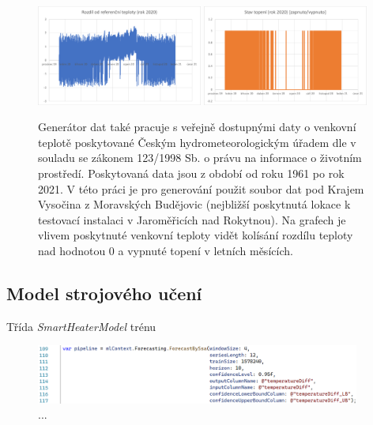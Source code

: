 \pagebreak

\begin{figure}[hbt]
\centering
\includegraphics[width=0.485\textwidth]{obrazky-figures/mlgen_3.png}
\includegraphics[width=0.485\textwidth]{obrazky-figures/mlgen_4.png}
\caption{Generátor dat také pracuje s veřejně dostupnými daty o venkovní teplotě  poskytované Českým hydrometeorologickým úřadem dle \cite{ml-chmu-data} v souladu se zákonem 123/1998 Sb. o právu na informace o životním prostředí. Poskytovaná data jsou z období od roku 1961 po rok 2021. V této práci je pro generování použit soubor dat pod Krajem Vysočina z Moravských Budějovic (nejbližší poskytnutá lokace k testovací instalaci v Jaroměřicích nad Rokytnou). Na grafech je vlivem poskytnuté venkovní teploty vidět kolísání rozdílu teploty nad hodnotou 0 a vypnuté topení v letních měsících.}
\end{figure}


\subsection{Model strojového učení}
Třída {\it SmartHeaterModel} trénu

\begin{figure}[hbt]
\includegraphics[width=0.95\textwidth]{obrazky-figures/ml-pipeline.png}
\caption{...}
\end{figure}

\pagebreak

